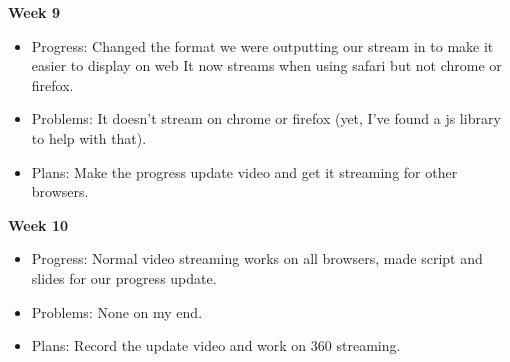         \newpage
        \textbf{Week 9}
        \begin{itemize}
            \item Progress: Changed the format we were outputting our stream in to make it easier to display on web It now streams when using safari but not chrome or firefox.
            \item Problems: It doesn't stream on chrome or firefox (yet, I've found a js library to help with that).
            \item Plans: Make the progress update video and get it streaming for other browsers.
        \end{itemize}
        \textbf{Week 10}
        \begin{itemize}
            \item Progress: Normal video streaming works on all browsers, made script and slides for our progress update.
            \item Problems: None on my end.
            \item Plans: Record the update video and work on 360 streaming.
        \end{itemize}
    
